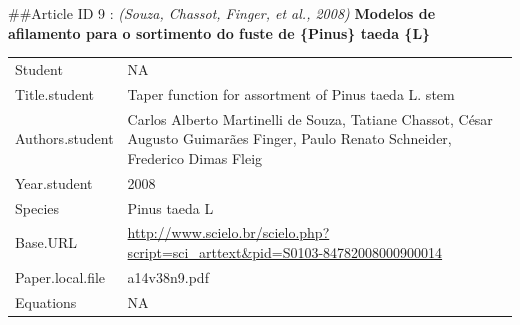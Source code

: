 \documentclass[]{article}
\begin{document}
\#\#Article ID 9 : \emph{(Souza, Chassot, Finger, et al., 2008)}
\textbf{Modelos de afilamento para o sortimento do fuste de \{Pinus\}
taeda \{L\}}

\begin{longtable}[]{@{}ll@{}}
\toprule
\endhead
\begin{minipage}[t]{0.21\columnwidth}\raggedright
Student\strut
\end{minipage} & \begin{minipage}[t]{0.73\columnwidth}\raggedright
NA\strut
\end{minipage}\tabularnewline
\begin{minipage}[t]{0.21\columnwidth}\raggedright
Title.student\strut
\end{minipage} & \begin{minipage}[t]{0.73\columnwidth}\raggedright
Taper function for assortment of Pinus taeda L. stem\strut
\end{minipage}\tabularnewline
\begin{minipage}[t]{0.21\columnwidth}\raggedright
Authors.student\strut
\end{minipage} & \begin{minipage}[t]{0.73\columnwidth}\raggedright
Carlos Alberto Martinelli de Souza, Tatiane Chassot, César Augusto
Guimarães Finger, Paulo Renato Schneider, Frederico Dimas Fleig\strut
\end{minipage}\tabularnewline
\begin{minipage}[t]{0.21\columnwidth}\raggedright
Year.student\strut
\end{minipage} & \begin{minipage}[t]{0.73\columnwidth}\raggedright
2008\strut
\end{minipage}\tabularnewline
\begin{minipage}[t]{0.21\columnwidth}\raggedright
Species\strut
\end{minipage} & \begin{minipage}[t]{0.73\columnwidth}\raggedright
Pinus taeda L\strut
\end{minipage}\tabularnewline
\begin{minipage}[t]{0.21\columnwidth}\raggedright
Base.URL\strut
\end{minipage} & \begin{minipage}[t]{0.73\columnwidth}\raggedright
\url{http://www.scielo.br/scielo.php?script=sci_arttext\&pid=S0103-84782008000900014}\strut
\end{minipage}\tabularnewline
\begin{minipage}[t]{0.21\columnwidth}\raggedright
Paper.local.file\strut
\end{minipage} & \begin{minipage}[t]{0.73\columnwidth}\raggedright
a14v38n9.pdf\strut
\end{minipage}\tabularnewline
\begin{minipage}[t]{0.21\columnwidth}\raggedright
Equations\strut
\end{minipage} & \begin{minipage}[t]{0.73\columnwidth}\raggedright
NA\strut
\end{minipage}\tabularnewline
\bottomrule
\end{longtable}
\end{document}
